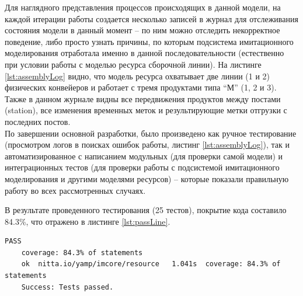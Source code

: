 \indent Для наглядного представления процессов происходящих в данной модели, на каждой итерации работы создается несколько записей в журнал для отслеживания состояния модели в данный момент -- по ним можно отследить некорректное поведение, либо просто узнать причины, по которым подсистема имитационного моделирования отработала именно в данной последовательности (естественно при условии работы с моделью ресурса сборочной линии).
На листинге \ref{lst:assemblyLog} видно, что модель ресурса охватывает две линии (1 и 2) физических конвейеров и работает с тремя продуктами типа ``М'' (1, 2 и 3).
Также в данном журнале видны все передвижения продуктов между постами (station), все изменения временных меток и результирующие метки отгрузки с последних постов.\\
\indent По завершении основной разработки, было произведено как ручное тестирование (просмотром логов в поисках ошибок работы, листинг \ref{lst:assemblyLog}), так и автоматизированное с написанием модульных (для проверки самой модели) и интеграционных тестов (для проверки работы с подсистемой имитационного моделирования и другими моделями ресурсов) -- которые показали правильную работу во всех рассмотренных случаях.

\indent В результате проведенного тестирования (25 тестов), покрытие кода составило 84.3\%, что отражено в листинге \ref{lst:passLine}.

\begin{lstlisting}[caption={Тестовое покрытие кода},label={lst:passLine}]
	PASS
	coverage: 84.3% of statements
	ok	nitta.io/yamp/imcore/resource	1.041s	coverage: 84.3% of statements
	Success: Tests passed.
\end{lstlisting}
